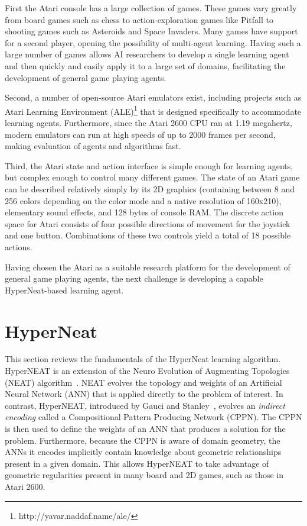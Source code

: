 \documentclass{acm_proc_article-sp}
\begin{document}
First the Atari console has a large collection of games. These games vary greatly from board games such as chess to action-exploration games like Pitfall to shooting games such as Asteroids and Space Invaders. Many games have support for a second player, opening the possibility of multi-agent learning. Having such a large number of games allows AI researchers to develop a single learning agent and then quickly and easily apply it to a large set of domains, facilitating the development of general game playing agents.

Second, a number of open-source Atari emulators exist, including projects such as Atari Learning Environment (ALE)\footnote{http://yavar.naddaf.name/ale/} that is designed specifically to accommodate learning agents. Furthermore, since the Atari 2600 CPU ran at 1.19 megahertz, modern emulators can run at high speeds of up to 2000 frames per second, making evaluation of agents and algorithms fast.

Third, the Atari state and action interface is simple enough for learning agents, but complex enough to control many different games. The state of an Atari game can be described relatively simply by its 2D graphics (containing between 8 and 256 colors depending on the color mode and a native resolution of 160x210), elementary sound effects, and 128 bytes of console RAM. The discrete action space for Atari consists of four possible directions of movement for the joystick and one button. Combinations of these two controls yield a total of 18 possible actions.

Having chosen the Atari as a suitable research platform for the development of general game playing agents, the next challenge is developing a capable HyperNeat-based learning agent.

\section{HyperNeat}
\label{sec:hyperneat}
This section reviews the fundamentals of the HyperNeat learning algorithm. HyperNEAT is an extension of the Neuro Evolution of Augmenting Topologies (NEAT) algorithm~\cite{stanley02}. NEAT evolves the topology and weights of an Artificial Neural Network (ANN) that is applied directly to the problem of interest. In contrast, HyperNEAT, introduced by Gauci and Stanley~\cite{gauci08}, evolves an \emph{indirect encoding} called a Compositional Pattern Producing Network (CPPN). The CPPN is then used to define the weights of an ANN that produces a solution for the problem. Furthermore, because the CPPN is aware of domain geometry, the ANNs it encodes implicitly contain knowledge about geometric relationships present in a given domain. This allows HyperNEAT to take advantage of geometric regularities present in many board and 2D games, such as those in Atari 2600.
\end{document}
